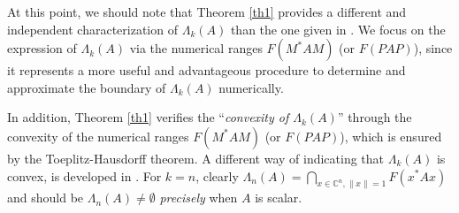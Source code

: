 \documentclass[12pt, reqno]{amsart}
\theoremstyle{definition}
\theoremstyle{remark}
\numberwithin{equation}{section}
\begin{document}
At this point, we should note that Theorem \ref{th1} provides a different and independent characterization of $\Lambda_{k}(A)$ than the one given in \cite[Cor. 4.9]{Poon-Li-Sze}. We focus on the expression of $\Lambda_{k}(A)$ via the numerical ranges $F(M^{*}AM)$ (or $F(PAP)$), since it represents a more useful and adva\-ntageous procedure to determine and approximate  the boundary of $\Lambda_{k}(A)$ numerically.


In addition, Theorem \ref{th1}  verifies the ``\emph{convexity of $\Lambda_{k}(A)$}''  through the convexi\-ty of the numerical ranges $F(M^{*}AM)$ (or $F(PAP)$), which is ensured by the Toeplitz-Hausdorff theorem. A different way of indicating that $\Lambda_{k}(A)$ is convex, is developed in \cite{Hugo}. For $k=n$, clearly $\Lambda_{n}(A)=\bigcap_{x\in\mathbb{C}^{n}, \|x\|=1}F(x^{*}Ax)$ and should be $\Lambda_{n}(A)\neq\emptyset$
\emph{precisely} when $A$ is scalar.
\end{document}

